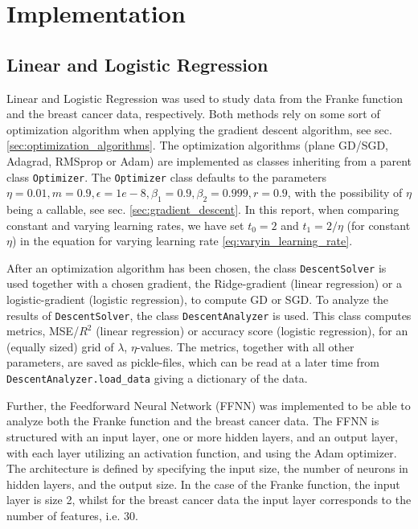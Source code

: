 \documentclass[%
reprint,s
amsmath,amssymb,
aps,
]{revtex4-2}
\begin{document}
\section{Implementation}
\subsection{Linear and Logistic Regression}
Linear and Logistic Regression was used to study data from the Franke function and the breast cancer data, respectively. Both methods rely on some sort of optimization algorithm when applying the gradient descent algorithm, see sec. \ref{sec:optimization_algorithms}. The optimization algorithms (plane GD/SGD, Adagrad, RMSprop or Adam) are implemented as classes inheriting from a parent class \texttt{Optimizer}. The \texttt{Optimizer} class defaults to the parameters \(\eta=0.01, m=0.9, \epsilon=1e-8, \beta_1=0.9, \beta_2=0.999, r=0.9\), with the possibility of \(\eta\) being a callable, see sec. \ref{sec:gradient_descent}. In this report, when comparing constant and varying learning rates, we have set \(t_0 = 2\) and \(t_{1} = 2/\eta\) (for constant \(\eta\)) in the equation for varying learning rate \eqref{eq:varyin_learning_rate}.

After an optimization algorithm has been chosen, the class \texttt{DescentSolver} is used together with a chosen gradient, the Ridge-gradient (linear regression) or a logistic-gradient (logistic regression), to compute GD or SGD. To analyze the results of \texttt{DescentSolver}, the class \texttt{DescentAnalyzer} is used. This class computes metrics, MSE/\(R^2\) (linear regression) or accuracy score (logistic regression), for an (equally sized) grid of \(\lambda\), \(\eta\)-values. The metrics, together with all other parameters, are saved as pickle-files, which can be read at a later time from \texttt{DescentAnalyzer.load\_data} giving a dictionary of the data. 

Further, the Feedforward Neural Network (FFNN) was implemented to be able to analyze both the Franke function and the breast cancer data. The FFNN is structured with an input layer, one or more hidden layers, and an output layer, with each layer utilizing an activation function, and using the Adam optimizer. The architecture is defined by specifying the input size, the number of neurons in hidden layers, and the output size. In the case of the Franke function, the input layer is size 2, whilst for the breast cancer data the input layer corresponds to the number of features, i.e. $30$. 
\end{document}

